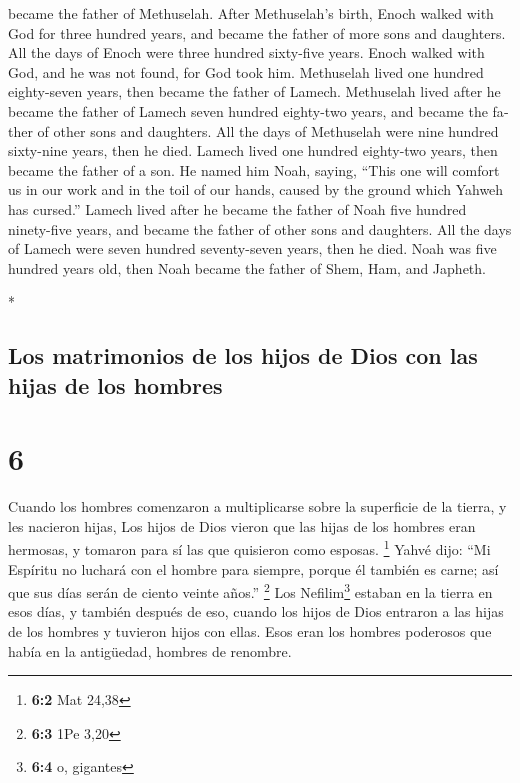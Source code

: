 \begin{paracol}{2}
\begin{otherlanguage}{english}
became the father of Methuselah.  After Methuselah's
birth, Enoch walked with God for three hundred years, and became the
father of more sons and daughters.  All the days of Enoch
were three hundred sixty-five years.  Enoch walked with
God, and he was not found, for God took him.  Methuselah
lived one hundred eighty-seven years, then became the father of Lamech.
 Methuselah lived after he became the father of Lamech
seven hundred eighty-two years, and became the father of other sons and
daughters.  All the days of Methuselah were nine hundred
sixty-nine years, then he died.  Lamech lived one hundred
eighty-two years, then became the father of a son.  He
named him Noah, saying, ``This one will comfort us in our work and in
the toil of our hands, caused by the ground which Yahweh has cursed.''
 Lamech lived after he became the father of Noah five
hundred ninety-five years, and became the father of other sons and
daughters.  All the days of Lamech were seven hundred
seventy-seven years, then he died.  Noah was five hundred
years old, then Noah became the father of Shem, Ham, and Japheth.

\end{otherlanguage}

\switchcolumn[0]*

\hypertarget{los-matrimonios-de-los-hijos-de-dios-con-las-hijas-de-los-hombres}{%
\subsection{Los matrimonios de los hijos de Dios con las hijas de los
hombres}\label{los-matrimonios-de-los-hijos-de-dios-con-las-hijas-de-los-hombres}}

\hypertarget{section-10}{%
\section{6}\label{section-10}}

 Cuando los hombres comenzaron a multiplicarse sobre la
superficie de la tierra, y les nacieron hijas,  Los hijos
de Dios vieron que las hijas de los hombres eran hermosas, y tomaron
para sí las que quisieron como esposas. \footnote{\textbf{6:2} Mat 24,38}
 Yahvé dijo: ``Mi Espíritu no luchará con el hombre para
siempre, porque él también es carne; así que sus días serán de ciento
veinte años.'' \footnote{\textbf{6:3} 1Pe 3,20}  Los
Nefilim\footnote{\textbf{6:4} o, gigantes} estaban en la tierra en esos
días, y también después de eso, cuando los hijos de Dios entraron a las
hijas de los hombres y tuvieron hijos con ellas. Esos eran los hombres
poderosos que había en la antigüedad, hombres de renombre.


\end{paracol}
